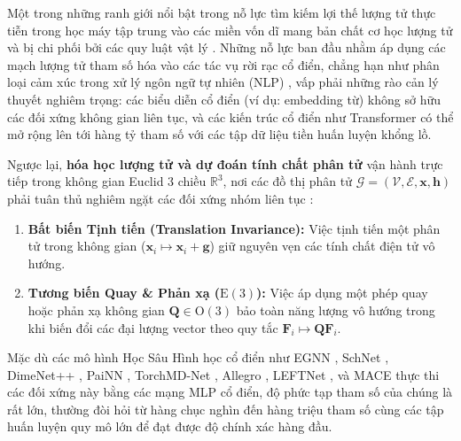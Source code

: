 \documentclass[10pt,twocolumn,letterpaper]{article}
\begin{document}
Một trong những ranh giới nổi bật trong nỗ lực tìm kiếm lợi thế lượng tử thực tiễn trong học máy tập trung vào các miền vốn dĩ mang bản chất cơ học lượng tử và bị chi phối bởi các quy luật vật lý \cite{Kandala:2017vok, Cerezo:2020mtn}. Những nỗ lực ban đầu nhằm áp dụng các mạch lượng tử tham số hóa vào các tác vụ rời rạc cổ điển, chẳng hạn như phân loại cảm xúc trong xử lý ngôn ngữ tự nhiên (NLP) \cite{Aktar:2025ihu}, vấp phải những rào cản lý thuyết nghiêm trọng: các biểu diễn cổ điển (ví dụ: embedding từ) không sở hữu các đối xứng không gian liên tục, và các kiến trúc cổ điển như Transformer có thể mở rộng lên tới hàng tỷ tham số với các tập dữ liệu tiền huấn luyện khổng lồ.

Ngược lại, \textbf{hóa học lượng tử và dự đoán tính chất phân tử} vận hành trực tiếp trong không gian Euclid 3 chiều $\mathbb{R}^3$, nơi các đồ thị phân tử $\mathcal{G} = (\mathcal{V}, \mathcal{E}, \mathbf{x}, \mathbf{h})$ phải tuân thủ nghiêm ngặt các đối xứng nhóm liên tục \cite{satorras2022enequivariantgraphneural, schütt2017schnetcontinuousfilterconvolutionalneural, thomasTensorFieldNetworks2018}:
\begin{enumerate}
    \item \textbf{Bất biến Tịnh tiến (Translation Invariance):} Việc tịnh tiến một phân tử trong không gian ($\mathbf{x}_i \mapsto \mathbf{x}_i + \mathbf{g}$) giữ nguyên vẹn các tính chất điện tử vô hướng.
    \item \textbf{Tương biến Quay \& Phản xạ ($\mathrm{E}(3)$):} Việc áp dụng một phép quay hoặc phản xạ không gian $\mathbf{Q} \in \mathrm{O}(3)$ bảo toàn năng lượng vô hướng trong khi biến đổi các đại lượng vector theo quy tắc $\mathbf{F}_i \mapsto \mathbf{Q}\mathbf{F}_i$.
\end{enumerate}

Mặc dù các mô hình Học Sâu Hình học cổ điển như EGNN \cite{satorras2022enequivariantgraphneural}, SchNet \cite{schütt2017schnetcontinuousfilterconvolutionalneural}, DimeNet++ \cite{klicperaFastUncertaintyAwareDirectional2020}, PaiNN \cite{schuttEquivariantMessagePassing2021}, TorchMD-Net \cite{tholke2022torchmdnet}, Allegro \cite{musaelianLearningLocalEquivariant2022}, LEFTNet \cite{duNewPerspectiveBuilding2023}, và MACE \cite{batatiaMACEHigherOrder2022} thực thi các đối xứng này bằng các mạng MLP cổ điển, độ phức tạp tham số của chúng là rất lớn, thường đòi hỏi từ hàng chục nghìn đến hàng triệu tham số cùng các tập huấn luyện quy mô lớn để đạt được độ chính xác hàng đầu.
\end{document}
